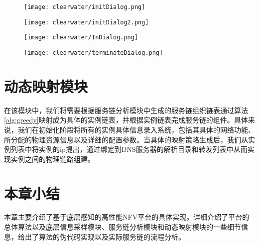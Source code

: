 \begin{figure}[!htp]
	\centering
	\label{fig:flow_dialog}
	\texttt{[image: clearwater/initDialog.png]}
\end{figure}

\begin{figure}[!htp]
	\ContinuedFloat
	\centering
	\label{fig:flow_dialog2}
	\texttt{[image: clearwater/initDialog2.png]}
\end{figure}

\begin{figure}[!htp]
	\centering
	\label{fig:flow_inDialog}
	\texttt{[image: clearwater/InDialog.png]}
\end{figure}

\begin{figure}[!htp]
	\centering
	\label{fig:flow_terminate}
	\texttt{[image: clearwater/terminateDialog.png]}
\end{figure}
\section{动态映射模块}
在该模块中，我们将需要根据服务链分析模块中生成的服务链组织链表通过算法\ref{alg:greedy}映射成为具体的实例链表，并根据实例链表完成服务链的组件。具体来说，我们在初始化阶段将所有的实例具体信息录入系统，包括其具体的网络功能、所分配的物理资源信息以及详细的配置参数。当具体的映射策略生成后，我们从实例列表中将实例的ip提出，通过绑定到DNS服务器的解析目录和转发列表中从而实现实例之间的物理链路组建。

\section{本章小结}
本章主要介绍了基于底层感知的高性能NFV平台的具体实现。详细介绍了平台的总体算法以及底层信息采样模块、服务链分析模块和动态映射模块的一些细节信息，给出了算法的伪代码实现以及实际服务链的流程分析。